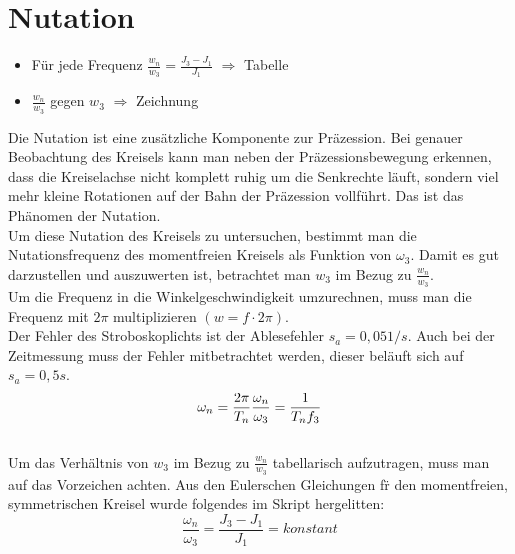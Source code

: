 

\section{Nutation}

\begin{itemize}
    \item Für jede Frequenz $\frac{w_n}{w_3} = \frac{J_3-J_1}{J_1}$ $\Rightarrow$ Tabelle
    \item $\frac{w_n}{w_3}$ gegen $w_3$ $\Rightarrow$ Zeichnung
\end{itemize}

Die Nutation ist eine zus\"atzliche Komponente zur Präzession. Bei genauer Beobachtung des Kreisels kann man neben der Präzessionsbewegung erkennen, dass die Kreiselachse nicht komplett ruhig um die Senkrechte läuft, sondern viel mehr kleine Rotationen auf der Bahn der Präzession vollführt. Das ist das Phänomen der Nutation.\\
Um diese Nutation des Kreisels zu untersuchen, bestimmt man die Nutationsfrequenz des momentfreien Kreisels als Funktion von $\omega_3$. Damit es gut darzustellen und auszuwerten ist, betrachtet man $w_3$ im Bezug zu $\frac{w_n}{w_3}$. \\
Um die Frequenz in die Winkelgeschwindigkeit umzurechnen, muss man die Frequenz mit $2\pi$ multiplizieren $(w = f\cdot2\pi)$.\\
Der Fehler des Stroboskoplichts ist der Ablesefehler $s_a = 0,05 1/s$. 
Auch bei der Zeitmessung muss der Fehler mitbetrachtet werden, dieser beläuft sich auf $s_a = 0,5s$.  \\
\begin{equation}
\omega_n = \frac{2\pi}{T_n}\\
\frac{\omega_n}{\omega_3} = \frac{1}{T_nf_3} 
\end{equation}\\
Um das Verh\"altnis von $w_3$ im Bezug zu $\frac{w_n}{w_3}$ tabellarisch aufzutragen, muss man auf das Vorzeichen achten. Aus den Eulerschen Gleichungen f\"r den momentfreien, symmetrischen Kreisel wurde folgendes im Skript hergelitten:
\begin{equation}
\frac{\omega_n}{\omega_3} = \frac{J_3 - J_1}{J_1} = konstant
\end{equation}\\
